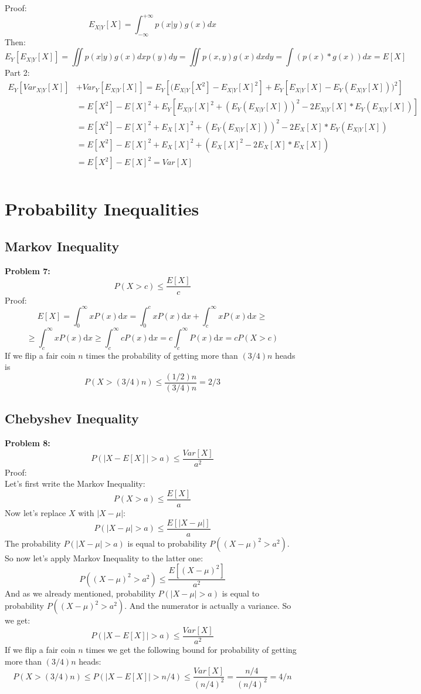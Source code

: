 \documentclass{article}
\begin{document}
Proof: \\
\[ E_{X|Y}[X] = \int_{-\infty}^{+\infty} p(x|y)g(x)dx \]
Then:
\[ E_Y[E_{X|Y}[X]] = \iint p(x|y)g(x)dx p(y)dy = \iint p(x,y)g(x)dxdy = \int (p(x)*g(x))dx = E[X] \]
Part 2:
\begin{equation*}
	\begin{aligned}
	E_{Y}[Var_{X|Y}[X]] & + Var_{Y}[E_{X|Y}[X]] = E_{Y}[(E_{X|Y}[X^2]-E_{X|Y}[X]^2] + E_{Y}[E_{X|Y}[X]-E_{Y}(E_{X|Y}[X]))^2]\\
	& = E[X^2]-E[X]^2 + E_{Y}[E_{X|Y}[X]^2 + (E_{Y}(E_{X|Y}[X]))^2 - 2E_{X|Y}[X] * E_{Y}(E_{X|Y}[X])]\\
	& = E[X^2]-E[X]^2 + E_{X}[X]^2 + (E_{Y}(E_{X|Y}[X]))^2 - 2E_{X}[X] * E_{Y}(E_{X|Y}[X])\\
	& = E[X^2]-E[X]^2 + E_{X}[X]^2 + (E_{X}[X]^2 - 2E_{X}[X] * E_{X}[X])\\
	& = E[X^2]-E[X]^2 = Var[X]\\
	\end{aligned}
\end{equation*}

\section{Probability Inequalities}

\subsection{Markov Inequality}
\textbf{Problem 7:}\\

\[P(X>c)\le \frac{E[X]}{c}\]
Proof:\\
\[E[X]=\int_0^{\infty}xP(x)\mathrm{d}x=
    \int_0^cxP(x)\mathrm{d}x+\int_c^{\infty}xP(x)\mathrm{d}x\ge\]
    \[\ge\int_c^{\infty}xP(x)\mathrm{d}x\ge
    \int_c^{\infty}cP(x)\mathrm{d}x=
    c\int_c^{\infty}P(x)\mathrm{d}x=
    cP(X>c)\]
If we flip a fair coin $n$ times the probability of getting more than $(3/4)n$ heads is
\[P(X>(3/4)n)\le \frac{(1/2)n}{(3/4)n}=2/3\]

\subsection{Chebyshev Inequality}
\textbf{Problem 8:}\\

\[P(|X-E[X]|>a)\le \frac{Var[X]}{a^2}\]
Proof:\\
Let's first write the Markov Inequality:
\[P(X>a)\le \frac{E[X]}{a}\]
Now let's replace $X$ with $|X-\mu|$:
\[P(|X-\mu|>a)\le \frac{E[|X-\mu|]}{a}\]
The probability $P(|X-\mu|>a)$ is equal to probability $P({(X-\mu)}^2>a^2)$. So now let's apply Markov Inequality to the latter one:
\[P({(X-\mu)}^2>a^2)\le \frac{E[{(X-\mu)}^2]}{a^2}\]
And as we already mentioned, probability $P(|X-\mu|>a)$ is equal to probability $P({(X-\mu)}^2>a^2)$. And the numerator is actually a variance. So we get:
\[P(|X-E[X]|>a)\le \frac{Var[X]}{a^2}\]
If we flip a fair coin $n$ times we get the following bound for probability of getting more than $(3/4)n$ heads:
\[P(X>(3/4)n)\le P(|X-E[X]|>n/4)\le \frac{Var[X]}{{(n/4)}^2}=\frac{n/4}{{(n/4)}^2}=4/n\]
\end{document}
